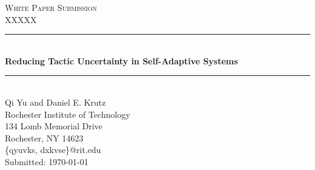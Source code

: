 \documentclass{article}
\newcommand{\Title}{Reducing Tactic Uncertainty in Self-Adaptive Systems}
\newcommand{\CallNumber}{XXXXX}
\begin{document}
\begin{titlepage}

  \newcommand{\HRule}{\rule{\linewidth}{0.5mm}} %

  \center %



  \textsc{\Large White Paper Submission}\\[0.5cm] %
  \textsc{\large \CallNumber}\\[0.5cm]   %
  






 \vspace{1.5 cm}
  \HRule \\[0.4cm]
  { \huge \bfseries \Title}\\[0.4cm] %
  \HRule \\[1.5cm]
 
  \vspace{.5 cm}
   Qi Yu and Daniel E. Krutz\\
  Rochester Institute of Technology\\
 134 Lomb Memorial Drive\\
 Rochester, NY 14623\\
 \{qyuvks, dxkvse\}@rit.edu\\


  \vspace{1.5 cm}
  {\large Submitted: \today}\\[3cm] %


\vfill %

\end{titlepage}




\end{document}
